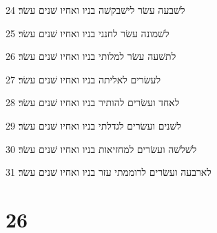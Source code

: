\par 24 לשׁבעה עשׂר לישׁבקשׁה בניו ואחיו שׁנים עשׂר׃
\par 25 לשׁמונה עשׂר לחנני בניו ואחיו שׁנים עשׂר׃
\par 26 לתשׁעה עשׂר למלותי בניו ואחיו שׁנים עשׂר׃
\par 27 לעשׂרים לאליתה בניו ואחיו שׁנים עשׂר׃
\par 28 לאחד ועשׂרים להותיר בניו ואחיו שׁנים עשׂר׃
\par 29 לשׁנים ועשׂרים לגדלתי בניו ואחיו שׁנים עשׂר׃
\par 30 לשׁלשׁה ועשׂרים למחזיאות בניו ואחיו שׁנים עשׂר׃
\par 31 לארבעה ועשׂרים לרוממתי עזר בניו ואחיו שׁנים עשׂר׃

\chapter{26}

